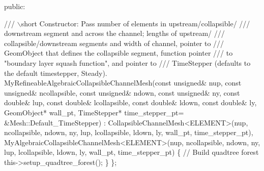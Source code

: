 \begin{DoxyItemize}
\begin{DoxyCodeInclude}
\textcolor{keyword}{public}: 

\textcolor{comment}{}
\textcolor{comment}{ /// \(\backslash\)short Constructor: Pass number of elements in upstream/collapsible/}
\textcolor{comment}{ /// downstream segment and across the channel; lengths of upstream/}
\textcolor{comment}{ /// collapsible/downstream segments and width of channel, pointer to }
\textcolor{comment}{ /// GeomObject that defines the collapsible segment, function pointer}
\textcolor{comment}{ /// to "boundary layer squash function", and pointer to }
\textcolor{comment}{ /// TimeStepper (defaults to the default timestepper, Steady). }
\textcolor{comment}{} MyRefineableAlgebraicCollapsibleChannelMesh(\textcolor{keyword}{const} \textcolor{keywordtype}{unsigned}& nup, 
                                             \textcolor{keyword}{const} \textcolor{keywordtype}{unsigned}& ncollapsible, 
                                             \textcolor{keyword}{const} \textcolor{keywordtype}{unsigned}& ndown, 
                                             \textcolor{keyword}{const} \textcolor{keywordtype}{unsigned}& ny, 
                                             \textcolor{keyword}{const} \textcolor{keywordtype}{double}& lup, 
                                             \textcolor{keyword}{const} \textcolor{keywordtype}{double}& lcollapsible, 
                                             \textcolor{keyword}{const} \textcolor{keywordtype}{double}& ldown, 
                                             \textcolor{keyword}{const} \textcolor{keywordtype}{double}& ly,
                                             GeomObject* wall\_pt,
                                             TimeStepper* time\_stepper\_pt=
                                             &Mesh::Default\_TimeStepper) :
  CollapsibleChannelMesh<ELEMENT>(nup, ncollapsible, ndown, ny,
                                  lup, lcollapsible, ldown, ly,
                                  wall\_pt,
                                  time\_stepper\_pt),
  MyAlgebraicCollapsibleChannelMesh<ELEMENT>(nup, ncollapsible, ndown, ny,
                                             lup, lcollapsible, ldown, ly,
                                             wall\_pt,
                                             time\_stepper\_pt)
  \{
   \textcolor{comment}{// Build quadtree forest}
   this->setup\_quadtree\_forest();
  \}
\};


\end{DoxyCodeInclude}
\end{DoxyItemize}
